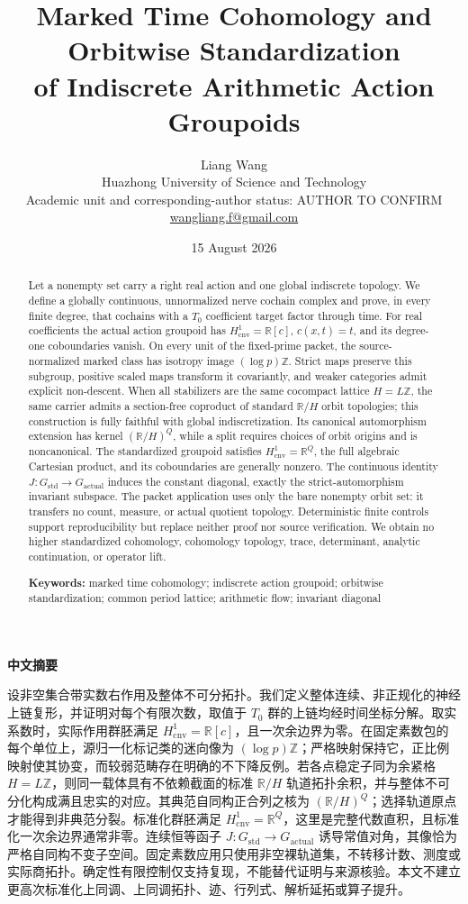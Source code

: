 \documentclass[11pt]{article}
\title{\textbf{Marked Time Cohomology and Orbitwise Standardization\\of Indiscrete Arithmetic Action Groupoids}}
\author{Liang Wang\\
\small Huazhong University of Science and Technology\\
\small Academic unit and corresponding-author status: AUTHOR TO CONFIRM\\
\small \href{mailto:wangliang.f@gmail.com}{wangliang.f@gmail.com}}
\date{15 August 2026}
\theoremstyle{definition}
\newcommand{\R}{\mathbb R}
\newcommand{\Z}{\mathbb Z}
\begin{document}
\maketitle

\begin{abstract}
Let a nonempty set carry a right real action and one global indiscrete
topology.  We define a globally continuous, unnormalized nerve cochain
complex and prove, in every finite degree, that cochains with a $T_0$
coefficient target factor through time.  For real coefficients the actual
action groupoid has $H^1_{\mathrm{cnv}}=\R[c]$, $c(x,t)=t$, and its
degree-one coboundaries vanish.  On every unit of the fixed-prime packet,
the source-normalized marked class has isotropy image $(\log p)\Z$.  Strict
maps preserve this subgroup, positive scaled maps transform it covariantly,
and weaker categories admit explicit non-descent.  When all stabilizers are
the same cocompact lattice $H=L\Z$, the same carrier admits a section-free
coproduct of standard $\R/H$ orbit topologies; this construction is fully
faithful with global indiscretization.  Its canonical automorphism extension
has kernel $(\R/H)^Q$, while a split requires choices of orbit origins and is
noncanonical.  The standardized groupoid satisfies
$H^1_{\mathrm{cnv}}=\R^Q$, the full algebraic Cartesian product, and its
coboundaries are generally nonzero.  The continuous identity
$J:G_{\mathrm{std}}\to G_{\mathrm{actual}}$ induces the constant diagonal,
exactly the strict-automorphism invariant subspace.  The packet application
uses only the bare nonempty orbit set: it transfers no count, measure, or
actual quotient topology.  Deterministic finite controls support
reproducibility but replace neither proof nor source verification.  We obtain
no higher standardized cohomology, cohomology topology, trace, determinant,
analytic continuation, or operator lift.

\medskip
\noindent\textbf{Keywords:} marked time cohomology; indiscrete action
groupoid; orbitwise standardization; common period lattice; arithmetic
flow; invariant diagonal
\end{abstract}

\begin{center}
\textbf{中文摘要}
\end{center}
设非空集合带实数右作用及整体不可分拓扑。我们定义整体连续、非正规化的神经上链复形，并证明对每个有限次数，取值于 $T_0$ 群的上链均经时间坐标分解。取实系数时，实际作用群胚满足 $H^1_{\mathrm{cnv}}=\R[c]$，且一次余边界为零。在固定素数包的每个单位上，源归一化标记类的迷向像为 $(\log p)\Z$；严格映射保持它，正比例映射使其协变，而较弱范畴存在明确的不下降反例。若各点稳定子同为余紧格 $H=L\Z$，则同一载体具有不依赖截面的标准 $\R/H$ 轨道拓扑余积，并与整体不可分化构成满且忠实的对应。其典范自同构正合列之核为 $(\R/H)^Q$；选择轨道原点才能得到非典范分裂。标准化群胚满足 $H^1_{\mathrm{cnv}}=\R^Q$，这里是完整代数直积，且标准化一次余边界通常非零。连续恒等函子 $J:G_{\mathrm{std}}\to G_{\mathrm{actual}}$ 诱导常值对角，其像恰为严格自同构不变子空间。固定素数应用只使用非空裸轨道集，不转移计数、测度或实际商拓扑。确定性有限控制仅支持复现，不能替代证明与来源核验。本文不建立更高次标准化上同调、上同调拓扑、迹、行列式、解析延拓或算子提升。
\end{document}

